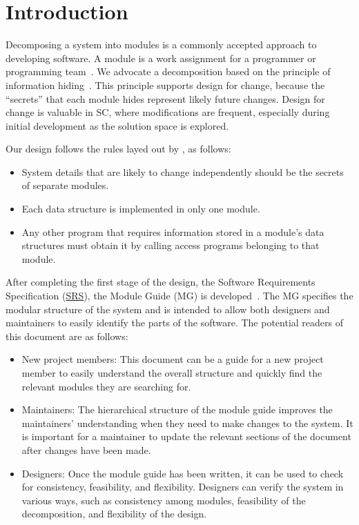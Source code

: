 \documentclass[12pt, titlepage]{article}
\begin{document}
\newpage

\tableofcontents

\listoftables

\listoffigures

\newpage


\section{Introduction}

Decomposing a system into modules is a commonly accepted approach to developing
software.  A module is a work assignment for a programmer or programming
team~\citep{ParnasEtAl1984}.  We advocate a decomposition
based on the principle of information hiding~\citep{Parnas1972a}.  This
principle supports design for change, because the ``secrets'' that each module
hides represent likely future changes.  Design for change is valuable in SC,
where modifications are frequent, especially during initial development as the
solution space is explored.  

Our design follows the rules layed out by \citet{ParnasEtAl1984}, as follows:
\begin{itemize}
\item System details that are likely to change independently should be the
  secrets of separate modules.
\item Each data structure is implemented in only one module.
\item Any other program that requires information stored in a module's data
  structures must obtain it by calling access programs belonging to that module.
\end{itemize}

After completing the first stage of the design, the Software Requirements
Specification (\href{https://github.com/NicLobo/Capstone-yoGERT/blob/main/docs/SRS/SRS.pdf}{SRS}), the Module Guide (MG) is developed~\citep{ParnasEtAl1984}. The MG
specifies the modular structure of the system and is intended to allow both
designers and maintainers to easily identify the parts of the software.  The
potential readers of this document are as follows:

\begin{itemize}
\item New project members: This document can be a guide for a new project member
  to easily understand the overall structure and quickly find the
  relevant modules they are searching for.
\item Maintainers: The hierarchical structure of the module guide improves the
  maintainers' understanding when they need to make changes to the system. It is
  important for a maintainer to update the relevant sections of the document
  after changes have been made.
\item Designers: Once the module guide has been written, it can be used to
  check for consistency, feasibility, and flexibility. Designers can verify the
  system in various ways, such as consistency among modules, feasibility of the
  decomposition, and flexibility of the design.
\end{itemize}
\end{document}
